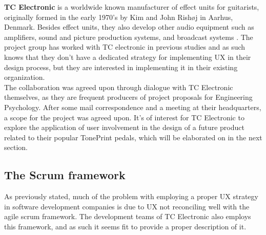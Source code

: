 \noindent
\textbf{TC Electronic} is a worldwide known manufacturer of effect units for guitarists, originally formed in the early 1970's by Kim and John Rishøj in Aarhus, Denmark. Besides effect units, they also develop other audio equipment such as amplifiers, sound and picture production systems, and broadcast systems \parencite{WEB:TCElectronic}. The project group has worked with TC electronic in previous studies and as such knows that they don't have a dedicated strategy for implementing UX in their design process, but they are interested in implementing it in their existing organization.\\

\noindent
The collaboration was agreed upon through dialogue with TC Electronic themselves, as they are frequent producers of project proposals for Engineering Psychology. After some mail correspondence and a meeting at their headquarters, a scope for the project was agreed upon. It's of interest for TC Electronic to explore the application of user involvement in the design of a future product related to their popular TonePrint pedals, which will be elaborated on in the next section.

\subsection{The Scrum framework}
\label{scrum}
As previously stated, much of the problem with employing a proper UX strategy in software development companies is due to UX not reconciling well with the agile scrum framework. The development teams of TC Electronic also employs this framework, and as such it seems fit to provide a proper description of it.\\

